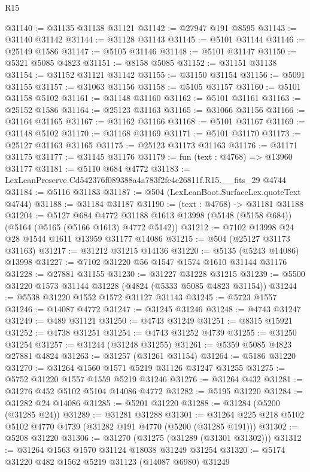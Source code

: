 \begin{lexlean}{R15}
\begin{coremodule}
{{{{{{{{{{{@31140 := @31135 @31138 @31121
@31142 := @27947 @191 @8595
@31143 := @31140 @31142
@31144 := @31128 @31143
@31145 := @5101 @31144
@31146 := @25149 @1586
@31147 := @5105 @31146
@31148 := @5101 @31147
@31150 := @5321 @5085 @4823
@31151 := @8158 @5085
@31152 := @31151 @31138
@31154 := @31152 @31121 @31142
@31155 := @31150 @31154
@31156 := @5091 @31155
@31157 := @31063 @31156
@31158 := @5105 @31157
@31160 := @5101 @31158 @5102
@31161 := @31148 @31160
@31162 := @5101 @31161
@31163 := @25152 @1586
@31164 := @25123 @31163
@31165 := @31066 @31156
@31166 := @31164 @31165
@31167 := @31162 @31166
@31168 := @5101 @31167
@31169 := @31148 @5102
@31170 := @31168 @31169
@31171 := @5101 @31170
@31173 := @25127 @31163 @31165
@31175 := @25123 @31173 @31163
@31176 := @31171 @31175
@31177 := @31145 @31176
@31179 := fun (text : @4768) => @13960 @31177
@31181 := @5110 @684 @4772
@31183 := LexLeanPreserve.Cd542376f089388a4a783f2fc4c26811f.R15.__fits_29 @4744
@31184 := @5116 @31183
@31187 := @504 (LexLeanBoot.SurfaceLex.quoteText @4744)
@31188 := @31184 @31187
@31190 := (text : @4768) -> @31181 @31188
@31204 := @5127
    @684
    @4772
    @31188
    @1613
    @13998
    (@5148 (@5158 @684))
    (@5164 (@5165 (@5166 @1613) @4772 @5142))
@31212 := @7102 @13998 @24 @28 @1544 @1611 @13959 @31177 @14086
@31215 := @504 (@25127 @31173 @31163)
@31217 := @31212 @31215 @14136
@31220 := @5135 (@5243 @14086) @13998
@31227 := @7102 @31220 @56 @1547 @1574 @1610 @31144 @31176
@31228 := @27881 @31155
@31230 := @31227 @31228 @31215
@31239 := @5500 @31220 @1573 @31144 @31228 (@4824 (@5333 @5085 @4823 @31154))
@31244 := @5538 @31220 @1552 @1572 @31127 @31143
@31245 := @5723 @1557
@31246 := @14087 @4772
@31247 := @31245 @31246
@31248 := @4743 @31247
@31249 := @489 @31121
@31250 := @4743 @31249
@31251 := @8315 @15921
@31252 := @4738 @31251
@31254 := @4743 @31252 @4739
@31255 := @31250 @31254
@31257 := @31244 (@31248 @31255)
@31261 := @5359 @5085 @4823 @27881 @4824
@31263 := @31257 (@31261 @31154)
@31264 := @5186 @31220
@31270 := @31264 @1560 @1571 @5219 @31126 @31247 @31255
@31275 := @5752 @31220 @1557 @1559 @5219 @31246
@31276 := @31264 @432
@31281 := @31276 @452 @5102 @5104 @14086 @4772
@31282 := @5195 @31220
@31284 := @31282 @24 @14086
@31285 := @5201 @31220
@31288 := @31284 (@5200 (@31285 @24))
@31289 := @31281 @31288
@31301 := @31264 @225 @218 @5102 @5102 @4770 @4739 (@31282 @191 @4770 (@5200 (@31285 @191)))
@31302 := @5208 @31220
@31306 := @31270 (@31275 (@31289 (@31301 @31302)))
@31312 := @31264 @1563 @1570 @31124 @18038 @31249 @31254
@31320 := @5174 @31220 @482 @1562 @5219 @31123 (@14087 @6980) @31249
}}}}}}}}}}}
\end{coremodule}
\end{lexlean}
